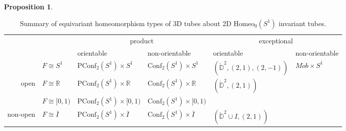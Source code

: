 \documentclass[10pt, oneside]{article}
\newcommand{\R}{\mathbb{R}}
\newcommand{\Z}{\mathbb{Z}}
\newcommand{\homeo}[1][S^1]{\text{Homeo}_0(#1)}
\newcommand{\cl}[1]{\overline{#1}}
\newcommand{\conf}[2][S^1]{\text{Conf}_{#2}(#1)}
\newcommand{\pconf}[2][S^1]{\text{PConf}_{#2}(#1)}
\theoremstyle{definition}
\newtheorem{prop}{Proposition}[section]
\theoremstyle{definition}
\begin{document}
\begin{prop}
\end{prop}
\setlength\extrarowheight{3pt}
\begin{table}[]
\begin{tabular}{rlll|ll}
\multicolumn{1}{l}{}       &                                              & \multicolumn{2}{c|}{product}                                                          & \multicolumn{2}{c}{exceptional}                                                                                 \\
\multicolumn{1}{l}{}       &                                              & \multicolumn{1}{l|}{orientable}                      & non-orientable                 & \multicolumn{1}{l|}{orientable}                                 & non-orientable                                \\ \cline{3-6}
                           & \multicolumn{1}{l|}{$F\cong S^1$}            & \multicolumn{1}{l|}{$\pconf{2}\times S^1$}           & $\conf{2}\times S^1$           & \multicolumn{1}{l|}{$(\mathring{\mathbb{D}}^2, (2, 1), (2,-1))$} & \multicolumn{1}{l|}{$M\ddot{o}b\times S^1$}   \\ \cline{2-6}
\multirow{-2}{*}{open}     & \multicolumn{1}{l|}{$F\cong \R$}             & \multicolumn{1}{l|}{$\pconf{2}\times \R$}            & $\conf{2}\times \R$            & \multicolumn{1}{l|}{$(\mathring{\mathbb{D}}^2, (2, 1))$}        & \multicolumn{1}{l|}{\cellcolor[HTML]{EFEFEF}} \\ \hline
                           & \multicolumn{1}{l|}{$F\cong \lbrack 0, 1 )$} & \multicolumn{1}{l|}{$\pconf{2}\times \lbrack 0, 1)$} & $\conf{2}\times \lbrack 0, 1)$ & \multicolumn{1}{l|}{\cellcolor[HTML]{EFEFEF}}                   & \multicolumn{1}{l|}{\cellcolor[HTML]{EFEFEF}} \\ \cline{2-6}
\multirow{-2}{*}{non-open} & \multicolumn{1}{l|}{$F\cong \cl{I}$}         & \multicolumn{1}{l|}{$\pconf{2}\times \cl{I}$}        & $\conf{2}\times \cl{I}$        & \multicolumn{1}{l|}{$(\mathring{\mathbb{D}}^2\cup I, (2,1))$}   & \multicolumn{1}{l|}{\cellcolor[HTML]{EFEFEF}} \\ \cline{2-6}
\end{tabular}
\caption{Summary of equivariant homeomorphism types of 3D tubes about 2D $\homeo$ invariant tubes.}
\label{table:orbit-bundles}
\end{table}
\end{document}
